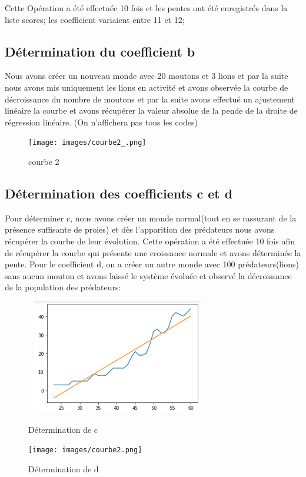 \documentclass[a4paper,12pt]{article} %
\begin{document}
Cette Opération a été effectuée 10 fois et les pentes ont été enregistrés dans la liste scores; les coefficient variaient entre 11 et 12;

\subsection{Détermination du coefficient b}
Nous avons créer un nouveau monde avec 20 moutons et 3 lions et par la suite nous avons mis uniquement les lions en activité et avons observée la courbe de décroissance du nombre de moutons et par la suite avons effectué un ajustement linéaire la courbe et avons récupérer la valeur absolue de la pende de la droite de régression linéaire.
(On n'affichera pas tous les codes)
\begin{figure}[h]
    \centering
    \texttt{[image: images/courbe2\_.png]}
    \caption{courbe 2}
\end{figure}

\subsection{Détermination des coefficients c et d}
Pour déterminer c, nous avons créer un monde normal(tout en se rassurant de la présence suffisante de proies) et dès l'apparition des prédateurs nous avons récupérer la courbe de leur évolution. Cette opération a été effectuée 10 fois afin de récupérer la courbe qui présente une croissance normale et avons déterminée la pente.
Pour le coefficient d, on a créer un autre monde avec 100 prédateurs(lions) sans aucun mouton et avons laissé le système évoluée et observé la décroissance de la population des prédateurs:

\begin{figure}[h]
    \begin{minipage}[c]{.46\linewidth}
        \centering
        \includegraphics[width=8cm, height=5cm]{images/courbe3.png}
        \caption{Détermination de c}
    \end{minipage}
    \hfill%
    \begin{minipage}[c]{.46\linewidth}
        \centering
        \texttt{[image: images/courbe2.png]}
        \caption{Détermination de d}
    \end{minipage}
\end{figure}
\end{document}
